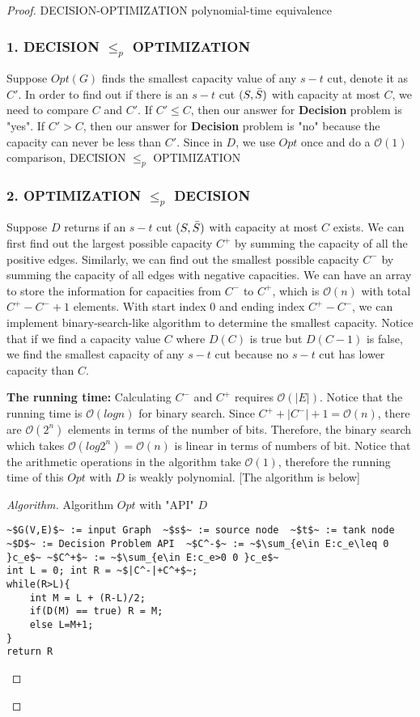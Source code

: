 \documentclass[openany]{article}
\begin{document}
\begin{proof}{}{DECISION-OPTIMIZATION polynomial-time equivalence}
    \subsubsection*{1. DECISION $\leq_p$ OPTIMIZATION}

Suppose $Opt(G)$ finds the smallest capacity value of any $s-t$ cut, denote it as $C'$. In order to find out if there is an $s-t$ cut $(S, \Bar{S})$ with capacity at most $C$, we need to compare $C$ and $C'$. If $C' \leq C$, then our answer for \textbf{Decision} problem is "yes". If $C' > C$, then our answer for \textbf{Decision} problem is "no" because the capacity can never be less than $C'$. Since in $D$, we use $Opt$ once and do a $\mathcal{O}(1)$ comparison, DECISION $\leq_p$ OPTIMIZATION

\subsubsection*{2. OPTIMIZATION $\leq_p$ DECISION}

Suppose $D$ returns if an $s-t$ cut $(S,\Bar{S})$ with capacity at most $C$ exists. We can first find out the largest possible capacity $C^+$ by summing the capacity of all the positive edges. Similarly, we can find out the smallest possible capacity $C^-$ by summing the capacity of all edges with negative capacities. We can have an array to store the information for capacities from $C^-$ to $C^+$, which is $\mathcal{O}(n)$ with total $C^+-C^-+1$ elements. With start index $0$ and ending index $C^+-C^-$, we can implement binary-search-like algorithm to determine the smallest capacity. Notice that if we find a capacity value $C$ where $D(C)$ is true but $D(C-1)$ is false, we find the smallest capacity of any $s-t$ cut because no $s-t$ cut has lower capacity than $C$. 

\textbf{The running time:} Calculating $C^-$ and $C^+$ requires $\mathcal{O}(|E|)$. Notice that the running time is $\mathcal{O}(log n)$ for binary search. Since $C^++|C^-|+1 = \mathcal{O}(n)$, there are $\mathcal{O}(2^n)$ elements in terms of the number of bits. Therefore, the binary search which takes $\mathcal{O}(log{2^n}) = \mathcal{O}(n)$ is linear in terms of numbers of bit. Notice that the arithmetic operations in the algorithm take $\mathcal{O}(1)$, therefore the running time of this $Opt$ with $D$ is weakly polynomial. [The algorithm is below]

\begin{proof}[Algorithm]{}
		\renewcommand{\qedsymbol}{}
		Algorithm $Opt$ with "API" $D$
		\begin{lstlisting}[basicstyle=\fontsize{8}{9}\selectfont\ttfamily]
~$G(V,E)$~ := input Graph  ~$s$~ := source node  ~$t$~ := tank node
~$D$~ := Decision Problem API  ~$C^-$~ := ~$\sum_{e\in E:c_e\leq 0 }c_e$~ ~$C^+$~ := ~$\sum_{e\in E:c_e>0 0 }c_e$~
int L = 0; int R = ~$|C^-|+C^+$~;
while(R>L){
    int M = L + (R-L)/2;
    if(D(M) == true) R = M;
    else L=M+1;
}
return R
		\end{lstlisting} 
\end{proof}


\end{proof}
\end{document}
